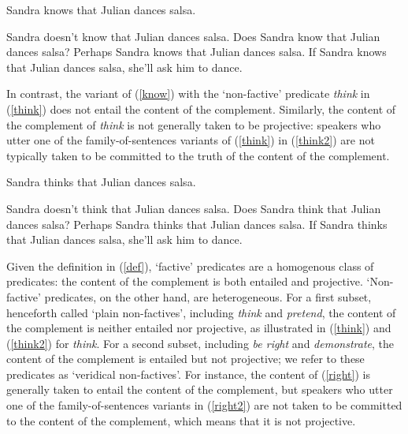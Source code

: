 \documentclass[11pt,fleqn]{article}
\newcommand{\6}{\mbox{$[\hspace*{-.6mm}[$}}
\newcommand{\9}{\mbox{$]\hspace*{-.6mm}]$}}
\begin{document}
\begin{exe}

\ex\label{know} Sandra knows that Julian dances salsa.

\ex\label{know2} 

\begin{xlist} 
\ex Sandra doesn't know that Julian dances salsa. 
\ex Does Sandra know that Julian dances salsa?
\ex Perhaps Sandra knows that Julian dances salsa.
\ex If Sandra knows that Julian dances salsa, she'll ask him to dance. 
\end{xlist}

\end{exe}

In contrast, the variant of (\ref{know}) with the `non-factive' predicate {\em think} in (\ref{think}) does not entail the content of the complement.  Similarly, the content of the complement of {\em think} is not generally taken to be projective: speakers who utter one of the family-of-sentences variants of (\ref{think}) in (\ref{think2}) are not typically taken to be committed to the truth of the content of the complement. 

\begin{exe}

\ex\label{think} Sandra thinks that Julian dances salsa.
\ex\label{think2} 

\begin{xlist} 
\ex Sandra doesn't think that Julian dances salsa. 
\ex Does Sandra think that Julian dances salsa?
\ex Perhaps Sandra thinks that Julian dances salsa.
\ex If Sandra thinks that Julian dances salsa, she'll ask him to dance. 
\end{xlist}

\end{exe}

Given the definition in (\ref{def}), `factive' predicates are a homogenous class of predicates: the content of the complement is both entailed and projective. `Non-factive' predicates, on the other hand, are heterogeneous. For a first subset, henceforth called `plain non-factives', including {\em think} and {\em pretend}, the content of the complement is neither entailed nor projective, as illustrated in (\ref{think}) and (\ref{think2}) for {\em think}. For a second subset, including {\em be right} and {\em demonstrate}, the content of the complement is entailed but not projective; we refer to these predicates as `veridical non-factives'. For instance, the content of (\ref{right}) is generally taken to entail the content of the complement, but speakers who utter one of the family-of-sentences variants in (\ref{right2}) are not taken to be committed to the content of the complement, which means that it is not projective. 
\end{document}
